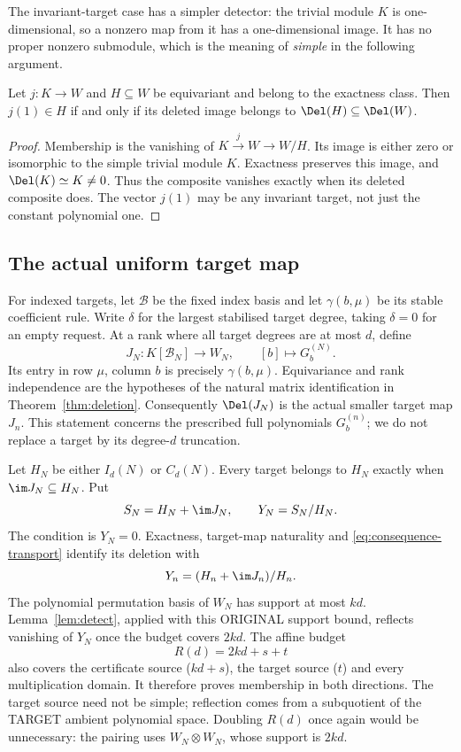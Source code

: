 The invariant-target case has a simpler detector: the trivial module
$K$ is one-dimensional, so a nonzero map from it has a one-dimensional
image. It has no proper nonzero submodule, which is the meaning of
\emph{simple} in the following argument.

\begin{lemma}\label{lem:constant}
Let $j:K\to W$ and $H\subseteq W$ be equivariant and belong to the
exactness class. Then $j(1)\in H$ if and only if its deleted image
belongs to $\Del(H)\subseteq\Del(W)$.
\end{lemma}
\begin{proof}
Membership is the vanishing of $K\xrightarrow{j}W\to W/H$.
Its image is either zero or isomorphic to the simple trivial module
$K$. Exactness preserves this image, and $\Del(K)\simeq K\ne0$.
Thus the composite vanishes exactly when its deleted composite does.
The vector $j(1)$ may be any invariant target, not just the constant
polynomial one.
\end{proof}

\subsection{The actual uniform target map}\label{sec:target-transfer}
For indexed targets, let $\mathcal B$ be the fixed index basis and
let $\gamma(b,\mu)$ be its stable coefficient rule. Write $\delta$ for the largest stabilised target degree, taking
$\delta=0$ for an empty request. At a rank where
all target degrees are at most $d$, define
\[
 J_N:K[\mathcal B_N]\longrightarrow W_N,\qquad
                [b]\longmapsto G_b^{(N)}.
\]
Its entry in row $\mu$, column $b$ is precisely $\gamma(b,\mu)$.
Equivariance and rank independence are the hypotheses of the natural
matrix identification in Theorem~\ref{thm:deletion}. Consequently
$\Del(J_N)$ is the actual smaller target map $J_n$.
This statement concerns the prescribed full polynomials $G_b^{(n)}$;
we do not replace a target by its degree-$d$ truncation.

Let $H_N$ be either $I_d(N)$ or $C_d(N)$. Every target belongs to
$H_N$ exactly when $\im J_N\subseteq H_N$. Put
\[
          S_N=H_N+\im J_N,\qquad Y_N=S_N/H_N.
\]
The condition is $Y_N=0$. Exactness, target-map naturality and
\eqref{eq:consequence-transport} identify its deletion with
\[
          Y_n=(H_n+\im J_n)/H_n.
\]
The polynomial permutation basis of $W_N$ has support at most $kd$.
Lemma~\ref{lem:detect}, applied with this ORIGINAL support bound,
reflects vanishing of $Y_N$ once the budget covers $2kd$.
The affine budget
\[
                            R(d)=2kd+s+t
\]
also covers the certificate source ($kd+s$), the target source ($t$)
and every multiplication domain. It therefore proves membership in
both directions. The target source need not be simple; reflection
comes from a subquotient of the TARGET ambient polynomial space.
Doubling $R(d)$ once again would be unnecessary: the pairing uses
$W_N\otimes W_N$, whose support is $2kd$.


